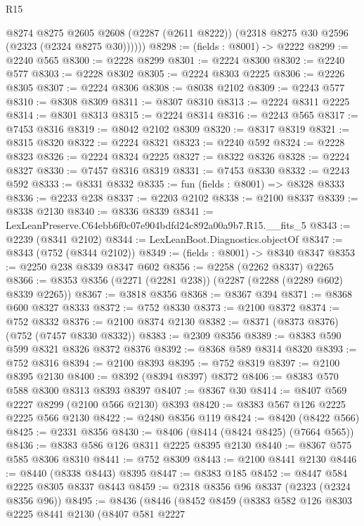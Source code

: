 \begin{lexlean}{R15}
\begin{coremodule}
        @8274
          @8275
          @2605
          @2608
          (@2287 (@2611 @8222))
          (@2318 @8275 @30 @2596 (@2323 (@2324 @8275 @30))))))
@8298 := (fields : @8001) -> @2222
@8299 := @2240 @565
@8300 := @2228 @8299
@8301 := @2224 @8300
@8302 := @2240 @577
@8303 := @2228 @8302
@8305 := @2224 @8303 @2225
@8306 := @2226 @8305
@8307 := @2224 @8306
@8308 := @8038 @2102
@8309 := @2243 @577
@8310 := @8308 @8309
@8311 := @8307 @8310
@8313 := @2224 @8311 @2225
@8314 := @8301 @8313
@8315 := @2224 @8314
@8316 := @2243 @565
@8317 := @7453 @8316
@8319 := @8042 @2102 @8309
@8320 := @8317 @8319
@8321 := @8315 @8320
@8322 := @2224 @8321
@8323 := @2240 @592
@8324 := @2228 @8323
@8326 := @2224 @8324 @2225
@8327 := @8322 @8326
@8328 := @2224 @8327
@8330 := @7457 @8316 @8319
@8331 := @7453 @8330
@8332 := @2243 @592
@8333 := @8331 @8332
@8335 := fun (fields : @8001) => @8328 @8333
@8336 := @2233 @238
@8337 := @2203 @2102
@8338 := @2100 @8337
@8339 := @8338 @2130
@8340 := @8336 @8339
@8341 := LexLeanPreserve.C64ebb6f0c07e904bdfd24c892a00a9b7.R15.__fits_5
@8343 := @2239 (@8341 @2102)
@8344 := LexLeanBoot.Diagnostics.objectOf
@8347 := @8343 (@752 (@8344 @2102))
@8349 := (fields : @8001) -> @8340 @8347
@8353 := @2250 @238 @8339 @8347 @602
@8356 := @2258 (@2262 @8337) @2265
@8366 := @8353 @8356 (@2271 (@2281 @238)) (@2287 (@2288 (@2289 @602) @8339 @2265))
@8367 := @3818 @8356
@8368 := @8367 @394
@8371 := @8368 @600 @8327 @8333
@8372 := @752 @8330
@8373 := @2100 @8372
@8374 := @752 @8332
@8376 := @2100 @8374 @2130
@8382 := @8371 (@8373 @8376) (@752 (@7457 @8330 @8332))
@8383 := @2309 @8356
@8389 := @8383 @590 @599 @8321 @8326 @8372 @8376
@8392 := @8368 @589 @8314 @8320
@8393 := @752 @8316
@8394 := @2100 @8393
@8395 := @752 @8319
@8397 := @2100 @8395 @2130
@8400 := @8392 (@8394 @8397) @8372
@8406 := @8383 @570 @588 @8300 @8313 @8393 @8397
@8407 := @8367 @30
@8414 := @8407 @569 @2227 @8299 (@2100 @566 @2130) @8393
@8420 := @8383 @567 @126 @2225 @2225 @566 @2130
@8422 := @2480 @8356 @119
@8424 := @8420 (@8422 @566)
@8425 := @2331 @8356
@8430 := @8406 (@8414 (@8424 @8425) (@7664 @565))
@8436 := @8383 @586 @126 @8311 @2225 @8395 @2130
@8440 := @8367 @575 @585 @8306 @8310
@8441 := @752 @8309
@8443 := @2100 @8441 @2130
@8446 := @8440 (@8338 @8443) @8395
@8447 := @8383 @185
@8452 := @8447 @584 @2225 @8305 @8337 @8443
@8459 := @2318 @8356 @96 @8337 (@2323 (@2324 @8356 @96))
@8495 := @8436
    (@8446
      (@8452
        @8459
        (@8383
          @582
          @126
          @8303
          @2225
          @8441
          @2130
          (@8407
            @581
            @2227

\end{coremodule}
\end{lexlean}
